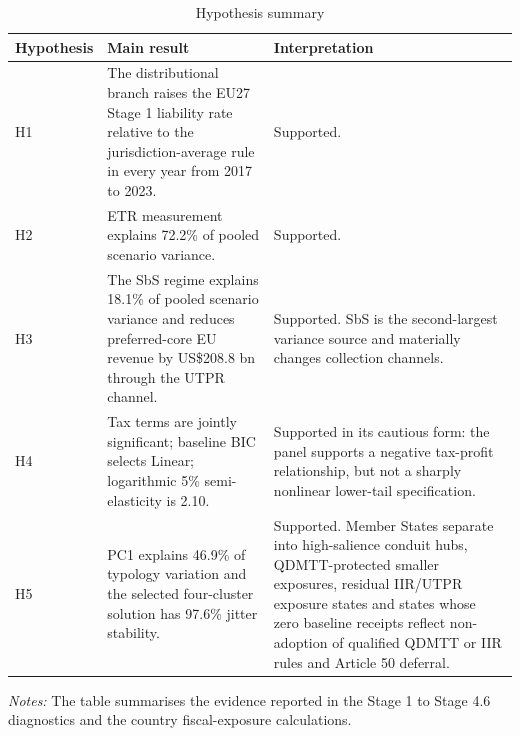 \begin{table}[H]
\centering
\small
\setlength{\tabcolsep}{4pt}
\caption[Hypothesis summary]{Hypothesis summary}
\label{tab:hypothesis_result_summary}
\begin{tabular}{@{}L{1.7cm}L{7.1cm}L{4.8cm}@{}}
\toprule
Hypothesis & Main result & Interpretation \\
\midrule
H1 & The distributional branch raises the EU27 Stage 1 liability rate relative to the jurisdiction-average rule in every year from 2017 to 2023. & Supported. \\
H2 & ETR measurement explains 72.2\% of pooled scenario variance. & Supported. \\
H3 & The SbS regime explains 18.1\% of pooled scenario variance and reduces preferred-core EU revenue by US\$208.8 bn through the UTPR channel. & Supported. SbS is the second-largest variance source and materially changes collection channels. \\
H4 & Tax terms are jointly significant; baseline BIC selects Linear; logarithmic 5\% semi-elasticity is 2.10. & Supported in its cautious form: the panel supports a negative tax-profit relationship, but not a sharply nonlinear lower-tail specification. \\
H5 & PC1 explains 46.9\% of typology variation and the selected four-cluster solution has 97.6\% jitter stability. & Supported. Member States separate into high-salience conduit hubs, QDMTT-protected smaller exposures, residual IIR/UTPR exposure states and states whose zero baseline receipts reflect non-adoption of qualified QDMTT or IIR rules and Article 50 deferral. \\
\bottomrule
\end{tabular}

\vspace{0.35em}
\noindent\begin{minipage}{\textwidth}
\footnotesize\raggedright\textit{Notes:} The table summarises the evidence reported in the Stage 1 to Stage 4.6 diagnostics and the country fiscal-exposure calculations.
\end{minipage}
\end{table}
